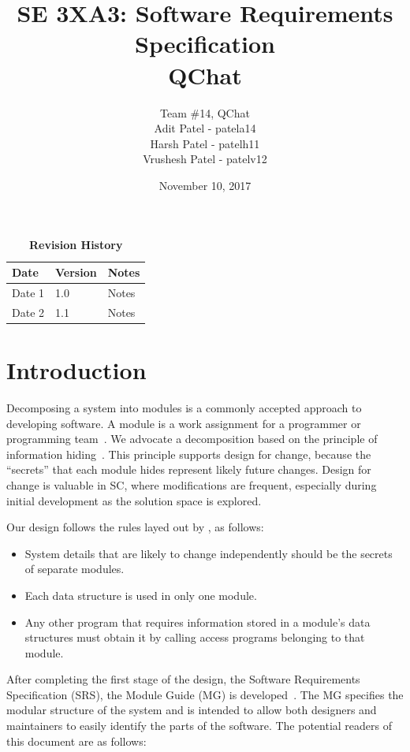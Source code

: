 \documentclass[12pt, titlepage]{article}
\title{SE 3XA3: Software Requirements Specification\\QChat}
\author{Team \#14, QChat
		\\ Adit Patel - patela14
		\\ Harsh Patel - patelh11
		\\ Vrushesh Patel - patelv12
}
\date{November 10, 2017}
\begin{document}
\maketitle

\tableofcontents
\listoftables
\listoffigures

\begin{table}[bp]
\caption{\bf Revision History}
\begin{tabularx}{\textwidth}{p{3cm}p{2cm}X}
\toprule {\bf Date} & {\bf Version} & {\bf Notes}\\
\midrule
Date 1 & 1.0 & Notes\\
Date 2 & 1.1 & Notes\\
\bottomrule
\end{tabularx}
\end{table}

\newpage


\section{Introduction}

Decomposing a system into modules is a commonly accepted approach to developing
software.  A module is a work assignment for a programmer or programming
team~\citep{ParnasEtAl1984}.  We advocate a decomposition
based on the principle of information hiding~\citep{Parnas1972a}.  This
principle supports design for change, because the ``secrets'' that each module
hides represent likely future changes.  Design for change is valuable in SC,
where modifications are frequent, especially during initial development as the
solution space is explored.  

Our design follows the rules layed out by \citet{ParnasEtAl1984}, as follows:
\begin{itemize}
\item System details that are likely to change independently should be the
  secrets of separate modules.
\item Each data structure is used in only one module.
\item Any other program that requires information stored in a module's data
  structures must obtain it by calling access programs belonging to that module.
\end{itemize}

After completing the first stage of the design, the Software Requirements
Specification (SRS), the Module Guide (MG) is developed~\citep{ParnasEtAl1984}. The MG
specifies the modular structure of the system and is intended to allow both
designers and maintainers to easily identify the parts of the software.  The
potential readers of this document are as follows:
\end{document}

